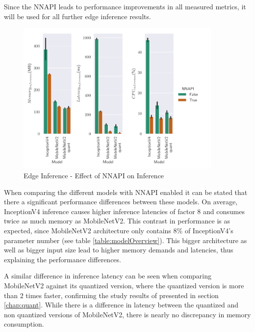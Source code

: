 Since the NNAPI leads to performance improvements in all measured metrics, it will be used for all further edge inference results.

\begin{figure}[H]
\centering
\includegraphics[width=0.9\textwidth]{./Bilder/single_plots/edge_inference_plots/NNAPI_behavior.pdf}
\caption{Edge Inference - Effect of NNAPI on Inference}
\label{fig:NNAPI}
\end{figure}

When comparing the different models with NNAPI enabled it can be stated that there a significant performance differences between these models.
On average, InceptionV4 inference causes higher inference latencies of factor $8$ and consumes twice as much memory as MobileNetV2.
This contrast in performance is as expected, since MobileNetV2 architecture only contains $8\%$ of InceptionV4's parameter number (see table \ref{table:modelOverview}).
This bigger architecture as well as bigger input size lead to higher memory demands and latencies, thus explaining the performance differences.

A similar difference in inference latency can be seen when comparing MobileNetV2 against its quantized version, where the quantized version is more than $2$ times faster, confirming the study results of \cite{Quantizing} presented in section \ref{chap:quant}.
While there is a difference in latency between the quantized and non quantized versions of MobileNetV2, there is nearly no discrepancy in memory consumption.



